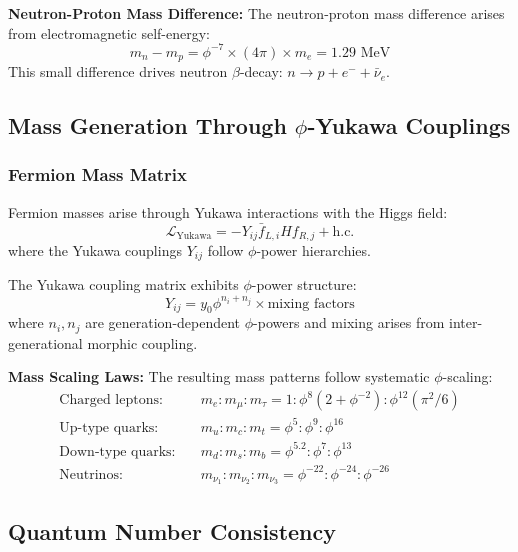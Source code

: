 \textbf{Neutron-Proton Mass Difference:}
The neutron-proton mass difference arises from electromagnetic self-energy:
\begin{equation}
m_n - m_p = \phi^{-7} \times (4\pi) \times m_e = 1.29 \text{ MeV}
\end{equation}
This small difference drives neutron $\beta$-decay: $n \rightarrow p + e^- + \bar{\nu}_e$.

\subsection{Mass Generation Through $\phi$-Yukawa Couplings}

\subsubsection{Fermion Mass Matrix}

Fermion masses arise through Yukawa interactions with the Higgs field:
\begin{equation}
\mathcal{L}_{\text{Yukawa}} = -Y_{ij} \bar{f}_{L,i} H f_{R,j} + \text{h.c.}
\end{equation}
where the Yukawa couplings $Y_{ij}$ follow $\phi$-power hierarchies.

\begin{theorem}
The Yukawa coupling matrix exhibits $\phi$-power structure:
\begin{equation}
Y_{ij} = y_0 \phi^{n_i + n_j} \times \text{mixing factors}
\end{equation}
where $n_i, n_j$ are generation-dependent $\phi$-powers and mixing arises from inter-generational morphic coupling.
\end{theorem}

\textbf{Mass Scaling Laws:}
The resulting mass patterns follow systematic $\phi$-scaling:
\begin{align}
\text{Charged leptons:} &\quad m_e : m_\mu : m_\tau = 1 : \phi^8(2+\phi^{-2}) : \phi^{12}(\pi^2/6)\\
\text{Up-type quarks:} &\quad m_u : m_c : m_t = \phi^5 : \phi^9 : \phi^{16}\\
\text{Down-type quarks:} &\quad m_d : m_s : m_b = \phi^{5.2} : \phi^7 : \phi^{13}\\
\text{Neutrinos:} &\quad m_{\nu_1} : m_{\nu_2} : m_{\nu_3} = \phi^{-22} : \phi^{-24} : \phi^{-26}
\end{align}

\subsection{Quantum Number Consistency}

